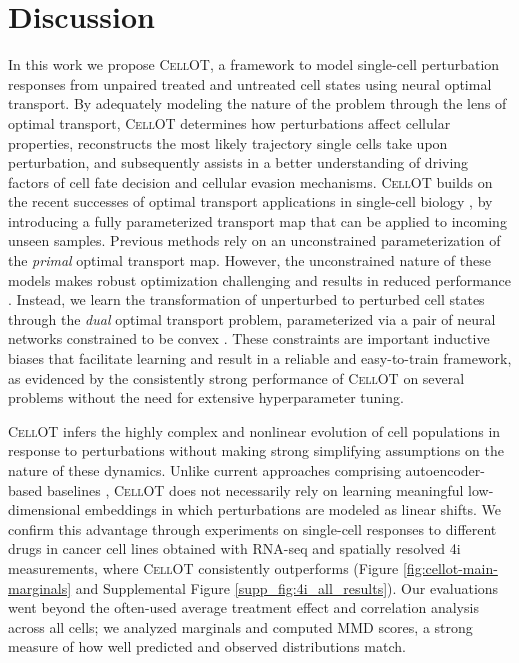 \section{Discussion}

In this work we propose \textsc{CellOT}, a framework to model single-cell perturbation responses from unpaired treated and untreated cell states using neural optimal transport.
By adequately modeling the nature of the problem through the lens of optimal transport, \textsc{CellOT} determines how perturbations affect cellular properties, reconstructs the most likely trajectory single cells take upon perturbation, and subsequently assists in a better understanding of driving factors of cell fate decision and cellular evasion mechanisms.
\textsc{CellOT} builds on the recent successes of optimal transport applications in single-cell biology \cite{schiebinger2019, lavenant2023}, by introducing a fully parameterized transport map that can be applied to incoming unseen samples.
Previous methods \cite{leygonie2019, yang2019, prasad2022} rely on an unconstrained parameterization of the \emph{primal} optimal transport map. However, the unconstrained nature of these models makes robust optimization challenging and results in reduced performance \cite[Table 1]{makkuva2020}.
Instead, we learn the transformation of unperturbed to perturbed cell states through the \emph{dual} optimal transport problem, parameterized via a pair of neural networks constrained to be convex \cite{makkuva2020}.
These constraints are important inductive biases that facilitate learning and result in a reliable and easy-to-train framework, as evidenced by the consistently strong performance of \textsc{CellOT} on several problems without the need for extensive hyperparameter tuning.

\textsc{CellOT} infers the highly complex and nonlinear evolution of cell populations in response to perturbations without making strong simplifying assumptions on the nature of these dynamics.
Unlike current approaches comprising autoencoder-based baselines \cite{lopez2018, lotfollahi2019, yang2020}, \textsc{CellOT} does not necessarily rely on learning meaningful low-dimensional embeddings in which perturbations are modeled as linear shifts. %
We confirm this advantage through experiments on single-cell responses to different drugs in cancer cell lines obtained with RNA-seq and spatially resolved 4i measurements, where \textsc{CellOT} consistently outperforms (Figure \ref{fig:cellot-main-marginals} and Supplemental Figure \ref{supp_fig:4i_all_results}). Our evaluations went beyond the often-used average treatment effect and correlation analysis across all cells; we analyzed marginals
and computed MMD scores, a strong measure of how well predicted and observed distributions match.

